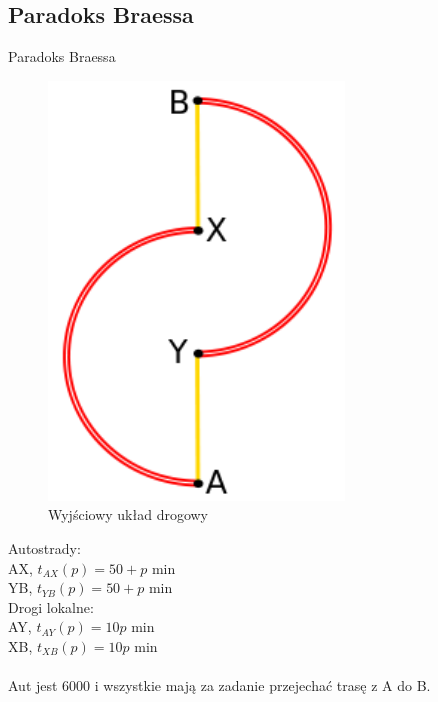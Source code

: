 \documentclass{beamer}
\begin{document}
\subsection{Paradoks Braessa }
\begin{frame}{Paradoks Braessa}

\centering
\begin{minipage}{.48\textwidth}
\begin{figure}[h!]
\includegraphics[width=0.7\textwidth]{img/braess1}
\caption{Wyjściowy układ drogowy}
\end{figure}
\end{minipage}\hfill
\begin{minipage}{.48\textwidth}

Autostrady:\\
AX, $t_{AX}(p) =  50 + p$ min\\
YB, $t_{YB}(p) =  50 + p$ min\\

Drogi lokalne:\\
AY, $t_{AY}(p) =  10p$ min\\
XB, $t_{XB}(p) =  10p$ min\\
\\
Aut jest 6000 i wszystkie mają za zadanie przejechać trasę z A do B.

\end{minipage}\hfill

\end{frame}
\end{document}
